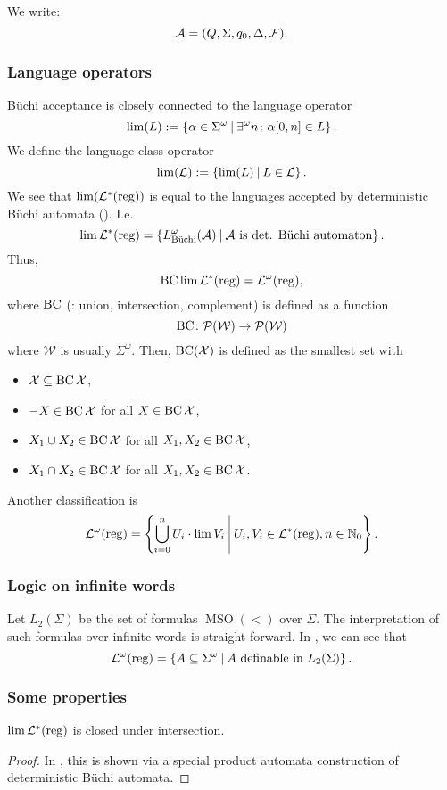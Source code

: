 We write:
\[ \mathcal{A} = (Q, \Sigma, q_0, \Delta, \mathcal{F}) . \]

\subsubsection{Language operators}

Büchi acceptance is closely connected to the language operator
\[ \lim(L) := \Set{ \alpha \in \Sigma^\omega }{ \existsinf n \colon \alpha[0,n] \in L } . \]
We define the language class operator
\[ \lim(\Lang) := \Set{\lim(L)}{L \in \Lang} . \]
We see that $\lim(\mathcal{L}^*(\textup{\textrm{reg}}))$ is equal to the languages accepted by deterministic Büchi automata (\cite{InfCompR101}). %
I.e.
\[ \lim \Langreg = \Set{L^\omega_\text{Büchi}(\A)}{\text{$\A$ is det. Büchi automaton}} . \]
Thus,
\[  \operatorname{BC} \lim \mathcal{L}^*(\textup{\textrm{reg}}) = \mathcal{L}^\omega(\textup{\textrm{reg}}) , \]
where $\operatorname{BC}$ (: union, intersection, complement) is defined as a function
\[ \operatorname{BC} \colon \mathcal{P}(\mathcal{W}) \rightarrow \mathcal{P}(\mathcal{W}) \]
where $\mathcal{W}$ is usually $\Sigma^\omega$. Then, $\operatorname{BC}(\mathcal{X})$ is defined as the smallest set with
\begin{itemize}
\item $\mathcal{X} \subseteq \operatorname{BC} \mathcal{X}$,
\item $-X \in \operatorname{BC} \mathcal{X}$ for all $X \in \operatorname{BC} \mathcal{X}$,
\item $X_1 \cup X_2 \in \operatorname{BC} \mathcal{X}$ for all $X_1,X_2 \in \operatorname{BC} \mathcal{X}$,
\item $X_1 \cap X_2 \in \operatorname{BC} \mathcal{X}$ for all $X_1,X_2 \in \operatorname{BC} \mathcal{X}$.
\end{itemize}

Another classification is
\[ \LangOreg = \Set{ \bigcup_{i=0}^n U_i \cdot \lim V_i }{ U_i, V_i \in \Langreg, n \in \N_0 } . \]

\subsubsection{Logic on infinite words}
Let $L_2(\Sigma)$ be the set of formulas $\operatorname{MSO}(<)$ over $\Sigma$. The interpretation of such formulas over infinite words is straight-forward. In \cite[Theorem 3.1]{CombR107}, we can see that
\[ \LangOreg = \Set{A \subseteq \Sigma^\omega}{A \text{ definable in } L_2(\Sigma)} . \]

\subsubsection{Some properties}

\begin{lemma}
\label{reg:limRegClosedIntersection}
$\lim \mathcal{L}^*(\textup{\textrm{reg}})$ is closed under intersection.
\begin{proof}
In \cite[Chapter 12, Remark 12.4]{CAVR112}, this is shown via a special product automata construction of deterministic Büchi automata.
\end{proof}
\end{lemma}
